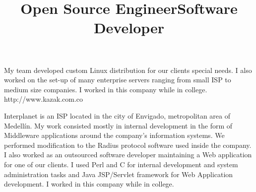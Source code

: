\begin{resume}
\title{\textbf{Open Source Engineer}}
\begin{position}
My team developed custom  Linux distribution for our clients
special needs. I also worked on  the set-up of many enterprise
servers ranging from small ISP to medium size companies. I worked in this company while in college.
http://www.kazak.com.co

\end{position}


\title{\textbf{Software Developer}}
\begin{position}
Interplanet is an  ISP located in the city of Envigado, metropolitan area of Medell\'{i}n.
My work consisted mostly  in internal development in the form of
Middleware applications  around the company's information systems.
We performed modification to the Radius protocol software used inside the company.
I also worked as an outsourced software developer maintaining a Web
application for one of our clients.  I used Perl and C for internal
development and  system administration tasks and Java JSP/Servlet
framework for Web Application development. I worked in this company
while in college.
\end{position}
\newline
\newline
\newline
\newline
\newline




\end{resume}
